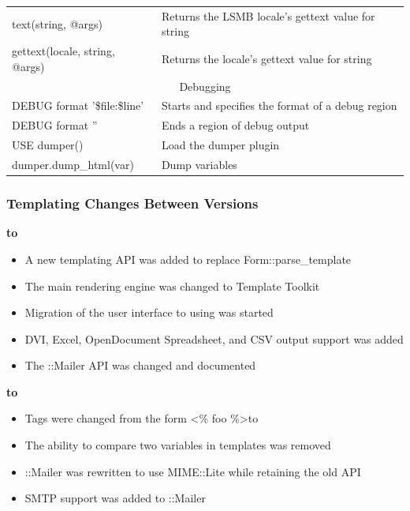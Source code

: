 \begin{tabular}{|l|p{7cm}|}
	\hline
	text(string, @args) & Returns the LSMB locale's gettext value for string\\
	gettext(locale, string, @args) & Returns the locale's gettext value for string\\
	\hline
	\multicolumn{2}{|c|}{Debugging}\\
	\hline
	DEBUG format '\$file:\$line' & Starts and specifies the format of a debug region\\
	DEBUG format '' & Ends a region of debug output\\
	USE dumper() & Load the dumper plugin\\
	dumper.dump\_html(var) & Dump variables\\
	\hline
\end{tabular}

\subsubsection{Templating Changes Between Versions}
\label{subsec-company-config-templates-changes}

\textbf{ to }

\begin{itemize}
	\item A new templating API was added to replace Form::parse\_template
	\item The main rendering engine was changed to Template Toolkit
	\item Migration of the user interface to using \lsmbt{ }was started
	\item DVI, Excel, OpenDocument Spreadsheet, and CSV output support was added
	\item The \lsmb::Mailer API was changed and documented
\end{itemize}

\newcommand{\tg}{\textgreater}
\newcommand{\tl}{\textless}

\textbf{ to }
\begin{itemize}
	\item Tags were changed from the form \tl\% foo \%\tg to 
	\item The ability to compare two variables in templates was removed
	\item \lsmb::Mailer was rewritten to use MIME::Lite while retaining the old API
	\item SMTP support was added to \lsmb::Mailer
\end{itemize}
